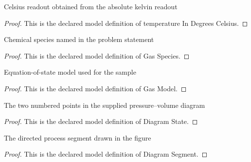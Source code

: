 \begin{definition}
  \label{def:physics:phyx-mini-0371:phyxminiproblems-problemphyxmini0371-temperatureindegreescelsius}
  Celsius readout obtained from the absolute kelvin readout
\end{definition}
\begin{proof}
  This is the declared model definition of temperature In Degrees Celsius.
\end{proof}
\begin{definition}
  \label{def:physics:phyx-mini-0371:phyxminiproblems-problemphyxmini0371-gasspecies}
  Chemical species named in the problem statement
\end{definition}
\begin{proof}
  This is the declared model definition of Gas Species.
\end{proof}
\begin{definition}
  \label{def:physics:phyx-mini-0371:phyxminiproblems-problemphyxmini0371-gasmodel}
  Equation-of-state model used for the sample
\end{definition}
\begin{proof}
  This is the declared model definition of Gas Model.
\end{proof}
\begin{definition}
  \label{def:physics:phyx-mini-0371:phyxminiproblems-problemphyxmini0371-diagramstate}
  The two numbered points in the supplied pressure--volume diagram
\end{definition}
\begin{proof}
  This is the declared model definition of Diagram State.
\end{proof}
\begin{definition}
  \label{def:physics:phyx-mini-0371:phyxminiproblems-problemphyxmini0371-diagramsegment}
  The directed process segment drawn in the figure
\end{definition}
\begin{proof}
  This is the declared model definition of Diagram Segment.
\end{proof}
